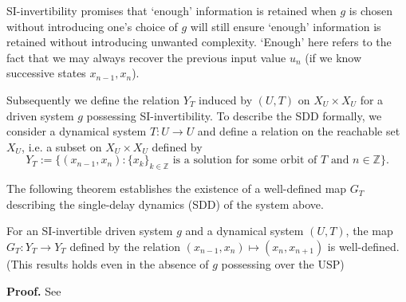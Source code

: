 SI-invertibility promises that `enough' information is retained when $g$ is chosen without introducing one's choice of $g$ will still ensure `enough' information is retained without introducing unwanted complexity. 
`Enough' here refers to the fact that we may always recover the previous input value $u_n$ (if we know successive states $x_{n-1}, x_n$).

Subsequently we define the relation $Y_T$ induced by $(U,T)$ on $X_U\times{X_U}$ for a driven system $g$ possessing SI-invertibility.  
To describe the  SDD formally, we consider a dynamical system $T: U \to U$ and define a relation on the reachable set $X_U$, i.e. a subset on $X_U \times X_U$  defined by 
\begin{equation}
  Y_T:=\{(x_{n-1},x_n): {\{x_k\}}_{k\in \mathbb{Z}} \mbox{ is a solution for some orbit of } T \mbox{ and } n \in \mathbb{Z}\}.  
\end{equation}


The following theorem establishes the existence of a well-defined map $G_T$ describing the single-delay dynamics (SDD) of the system above. 

\begin{Theorem}\label{Thm_GT_Exists}
  For an SI-invertible driven system $g$ and a dynamical system $(U,T)$, the map $G_T: Y_T \to Y_T$ defined by the relation $(x_{n-1},x_n) \mapsto (x_n,x_{n+1})$ is well-defined. 
  (This results holds even in the absence of $g$ possessing over the USP) 
  \end{Theorem}
  \vspace{-6mm}
  {\bf Proof.} See~\cite[Th.3]{Supp}


